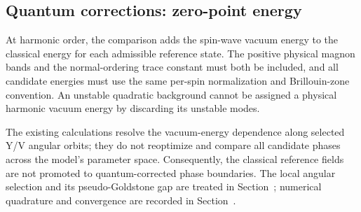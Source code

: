 \subsection{Quantum corrections: zero-point
energy}\label{sec-nbcp-phase-quantum-correction}

At harmonic order, the comparison adds the spin-wave vacuum energy to
the classical energy for each admissible reference state. The positive
physical magnon bands and the normal-ordering trace constant must both
be included, and all candidate energies must use the same per-spin
normalization and Brillouin-zone convention. An unstable quadratic
background cannot be assigned a physical harmonic vacuum energy by
discarding its unstable modes.

The existing calculations resolve the vacuum-energy dependence along
selected Y/V angular orbits; they do not reoptimize and compare all
candidate phases across the model's parameter space. Consequently, the
classical reference fields are not promoted to quantum-corrected phase
boundaries. The local angular selection and its pseudo-Goldstone gap are
treated in Section~; numerical quadrature
and convergence are recorded in Section~.
